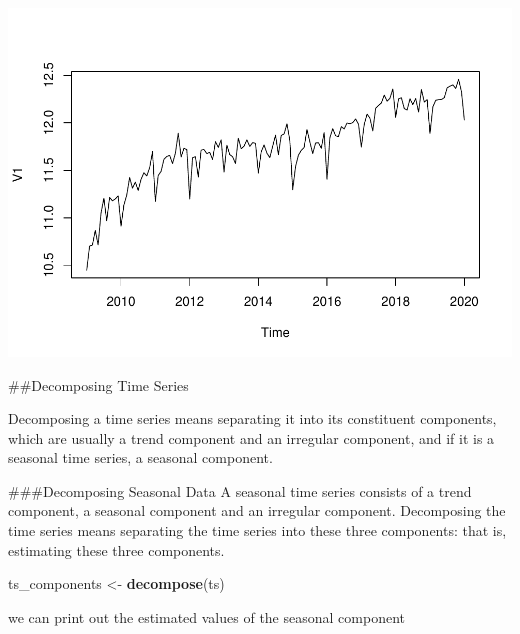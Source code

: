 \documentclass[
]{article}
\newenvironment{Shaded}{\begin{snugshade}}{\end{snugshade}}
\newcommand{\KeywordTok}[1]{\textcolor[rgb]{0.13,0.29,0.53}{\textbf{#1}}}
\newcommand{\NormalTok}[1]{#1}
\newcommand{\OperatorTok}[1]{\textcolor[rgb]{0.81,0.36,0.00}{\textbf{#1}}}
\newcommand{\StringTok}[1]{\textcolor[rgb]{0.31,0.60,0.02}{#1}}
\begin{document}
\includegraphics{tsf_export_files/figure-latex/unnamed-chunk-5-1.pdf}

\#\#Decomposing Time Series

Decomposing a time series means separating it into its constituent
components, which are usually a trend component and an irregular
component, and if it is a seasonal time series, a seasonal component.

\#\#\#Decomposing Seasonal Data A seasonal time series consists of a
trend component, a seasonal component and an irregular component.
Decomposing the time series means separating the time series into these
three components: that is, estimating these three components.

\begin{Shaded}
\begin{Highlighting}[]
\NormalTok{ts_components <-}\StringTok{ }\KeywordTok{decompose}\NormalTok{(ts)}
\end{Highlighting}
\end{Shaded}

we can print out the estimated values of the seasonal component

\begin{Shaded}
\end{Shaded}
\end{document}
